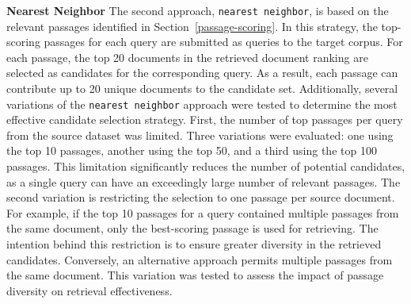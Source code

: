 \textbf{Nearest Neighbor} The second approach, \texttt{nearest neighbor}, is based on the relevant passages identified in Section~\ref{passage-scoring}. In this strategy, the top-scoring passages for each query are submitted as queries to the target corpus. For each passage, the top 20 documents in the retrieved document ranking are selected as candidates for the corresponding query. As a result, each passage can contribute up to 20 unique documents to the candidate set. Additionally, several variations of the \texttt{nearest neighbor} approach were tested to determine the most effective candidate selection strategy. First, the number of top passages per query from the source dataset was limited. Three variations were evaluated: one using the top 10 passages, another using the top 50, and a third using the top 100 passages. This limitation significantly reduces the number of potential candidates, as a single query can have an exceedingly large number of relevant passages. The second variation is restricting the selection to one passage per source document. For example, if the top 10 passages for a query contained multiple passages from the same document, only the best-scoring passage is used for retrieving. The intention behind this restriction is to ensure greater diversity in the retrieved candidates. Conversely, an alternative approach permits multiple passages from the same document. This variation was tested to assess the impact of passage diversity on retrieval effectiveness.
